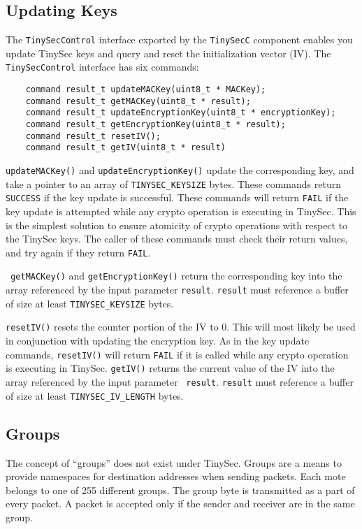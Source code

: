 \documentclass[11pt]{article}
\begin{document}
\subsection{Updating Keys}
The {\tt TinySecControl} interface exported by the {\tt TinySecC} component
enables you update TinySec keys and query and reset the initialization vector
(IV). The {\tt TinySecControl} interface has six commands:

\begin{verbatim}
    command result_t updateMACKey(uint8_t * MACKey);
    command result_t getMACKey(uint8_t * result);
    command result_t updateEncryptionKey(uint8_t * encryptionKey);
    command result_t getEncryptionKey(uint8_t * result);
    command result_t resetIV();
    command result_t getIV(uint8_t * result)
\end{verbatim}

{\tt updateMACKey()} and {\tt updateEncryptionKey()} update the corresponding
key, and take a pointer to an array of {\tt TINYSEC\_KEYSIZE} bytes. These
commands return {\tt SUCCESS} if the key update is successful. These commands
will return {\tt FAIL} if the key update is attempted while any crypto operation
is executing in TinySec. This is the simplest solution to ensure atomicity of
crypto operations with respect to the TinySec keys. The caller of these commands
must check their return values, and try again if they return {\tt FAIL}.

{\tt
  getMACKey()} and {\tt getEncryptionKey()} return the corresponding key into
the array referenced by the input parameter {\tt result}. {\tt result} must
reference a buffer of size at least {\tt TINYSEC\_KEYSIZE} bytes. 

{\tt resetIV()} resets the counter portion of the IV to 0. This will most likely
be used in conjunction with updating the encryption key. As in the key
update commands, {\tt resetIV()} will return {\tt FAIL} if it is called while
any crypto operation is executing in TinySec. {\tt getIV()} returns
the current value of the IV into the array referenced by the input parameter {\tt
  result}. {\tt result} must
reference a buffer of size at least {\tt TINYSEC\_IV\_LENGTH} bytes.
 
\subsection{Groups}
\label{sec:groups}
The concept of ``groups'' does not exist under TinySec. Groups are a
means to provide namespaces for destination addresses when sending
packets.  Each mote belongs to one of 255 different groups. The group byte is
transmitted as a part of every packet. A packet is accepted only if the sender
and receiver are in the same group.
\end{document}
